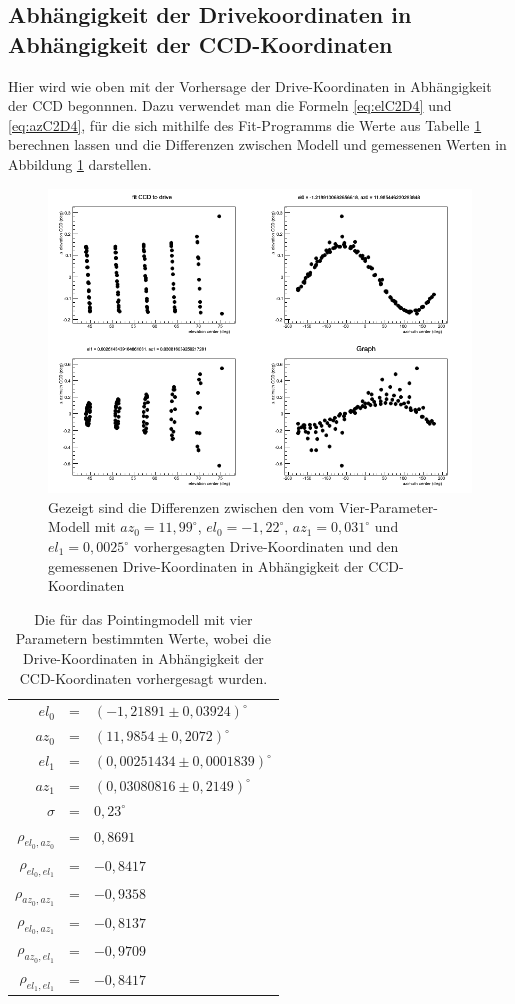 \subsection{Abhängigkeit der Drivekoordinaten in Abhängigkeit der CCD-Koordinaten}
Hier wird wie oben mit der Vorhersage der Drive-Koordinaten in Abhängigkeit der CCD begonnnen. Dazu verwendet man die Formeln \ref{eq:elC2D4} und \ref{eq:azC2D4}, für die sich mithilfe des Fit-Programms die Werte aus Tabelle \ref{tab:C2D4} berechnen lassen und die Differenzen zwischen Modell und gemessenen Werten in Abbildung \ref{img:C2D4} darstellen.
\begin{figure}[htbp]
\centering
\includegraphics[width=\textwidth]{../341/run341C2D_4par.png}
\caption{Gezeigt sind die Differenzen zwischen den vom Vier-Parameter-Modell mit $az_0=11,99^{\circ}$, $el_0=-1,22^{\circ}$, $az_1=0,031^{\circ}$ und $el_1=0,0025^{\circ}$ vorhergesagten Drive-Koordinaten und den gemessenen Drive-Koordinaten in Abhängigkeit der CCD-Koordinaten}
\label{img:C2D4}
\end{figure}
\begin{table}[htbp]
\centering
\begin{tabular}{rcl}
\toprule
$el_0$ &=& $(-1,21891\pm 0,03924)^{\circ}$\\
$az_0$ &=& $(11,9854\pm0,2072)^{\circ}$\\
$el_1$ &=& $(0,00251434\pm 0,0001839)^{\circ}$\\
$az_1$ &=& $(0,03080816\pm0,2149)^{\circ}$\\
$\sigma$ &=& $0,23^{\circ}$\\
$\rho_{el_0,az_0}$ &=& $0,8691$\\
$\rho_{el_0,el_1}$ &=& $-0,8417$\\
$\rho_{az_0,az_1}$ &=& $-0,9358$\\
$\rho_{el_0,az_1}$ &=& $-0,8137$\\
$\rho_{az_0,el_1}$ &=& $-0,9709$\\
$\rho_{el_1,el_1}$ &=& $-0,8417$\\
\bottomrule
\end{tabular}
\label{tab:C2D4}
\caption{Die für das Pointingmodell mit vier Parametern bestimmten Werte, wobei die Drive-Koordinaten in Abhängigkeit der CCD-Koordinaten vorhergesagt wurden.}
\end{table}

